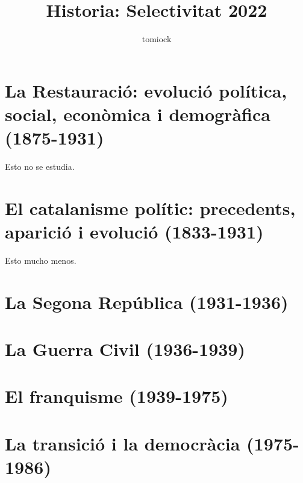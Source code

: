 \documentclass[arial,a4paper,print]{article}
\title{Historia: Selectivitat 2022}
\author{tomiock}
\begin{document}
	
\maketitle

\section{La Restauració: evolució política, social, econòmica i demogràfica (1875-1931)}
Esto no se estudia. 

\section{El catalanisme polític: precedents, aparició i evolució (1833-1931)}
Esto mucho menos. 

\section{La Segona República (1931-1936)}


\section{La Guerra Civil (1936-1939)}

\section{El franquisme (1939-1975)}

\section{ La transició i la democràcia (1975-1986)}

	
\end{document}
